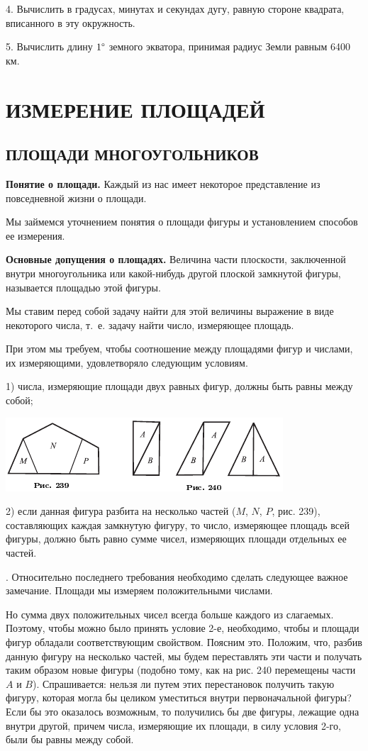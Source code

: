 \documentclass[oneside]{book}
\begin{document}
4.
Вычислить в градусах, минутах и секундах дугу, равную стороне квадрата, вписанного в эту окружность.

5.
Вычислить длину $1\degree$ земного экватора, принимая радиус Земли равным 6400 км.

\chapter{ИЗМЕРЕНИЕ ПЛОЩАДЕЙ}

\section{ПЛОЩАДИ МНОГОУГОЛЬНИКОВ}

\textbf{Понятие о площади.}
Каждый из нас имеет некоторое представление из повседневной жизни о площади.

Мы займемся уточнением понятия о площади фигуры и установлением способов ее измерения.

\textbf{Основные допущения о площадях.}
Величина части плоскости, заключенной внутри многоугольника или какой-нибудь другой плоской замкнутой фигуры, называется площадью этой фигуры.

Мы ставим перед собой задачу найти для этой величины выражение в виде некоторого числа, т.~е. задачу найти число, измеряющее площадь.

При этом мы требуем, чтобы соотношение между площадями фигур и числами, их измеряющими, удовлетворяло следующим условиям.

1) числа, измеряющие площади двух равных фигур, должны быть равны между собой;

\includegraphics{pics/ris-239-240}

2) если данная фигура разбита на несколько частей ($M$, $N$, $P$, рис. 239), составляющих каждая замкнутую фигуру, то число, измеряющее площадь всей фигуры, должно быть равно сумме чисел, измеряющих площади отдельных ее частей.

.
Относительно последнего требования необходимо сделать следующее важное замечание.
Площади мы измеряем положительными числами.

Но сумма двух положительных чисел всегда больше каждого из слагаемых.
Поэтому, чтобы можно было принять условие 2-е, %
необходимо, чтобы и площади фигур обладали соответствующим свойством.
Поясним это.
Положим, что, разбив данную фигуру на несколько частей, мы будем переставлять эти части и получать таким образом новые фигуры (подобно тому, как на рис. 240 перемещены части $A$ и $B$).
Спрашивается:
нельзя ли путем этих перестановок получить такую фигуру, которая могла бы целиком уместиться внутри первоначальной фигуры? Если бы это оказалось возможным, то получились бы две фигуры, лежащие одна внутри другой, причем числа, измеряющие их площади, в силу условия 2-го, %
были бы равны между собой.
\end{document}

